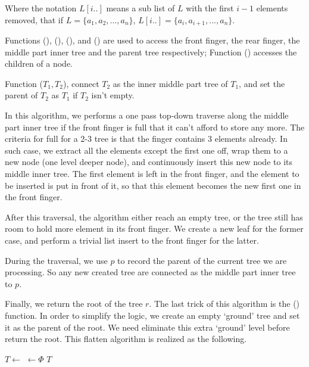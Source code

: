 \documentclass[UTF8]{article}
\begin{document}
Where the notation $L[i..]$ means a sub list of $L$ with the first $i-1$
elements removed, that if $L = \{a_1, a_2, ..., a_n\}$, $L[i..] = \{a_i, a_{i+1}, ..., a_n\}$.

Functions (), (), (), and ()
are used to access the front finger, the rear finger, the middle part inner tree and
the parent tree respectively; Function () accesses the children of a
node.

Function ($T_1, T_2$), connect $T_2$ as the inner middle part tree of
$T_1$, and set the parent of $T_2$ as $T_1$ if $T_2$ isn't empty.

In this algorithm, we performs a one pass top-down traverse along the middle part inner tree
if the front finger is full that it can't afford to store any more. The criteria for full
for a 2-3 tree is that the finger contains 3 elements already. In such case, we
extract all the elements except the first one off, wrap them to a new node (one level deeper node),
and continuously insert this new node to its middle inner tree. The first element is left
in the front finger, and the element to be inserted is put in front of it, so that this
element becomes the new first one in the front finger.

After this traversal, the algorithm either reach an empty tree, or the tree still has room
to hold more element in its front finger. We create a new leaf for the former case, and
perform a trivial list insert to the front finger for the latter.

During the traversal, we use $p$ to record the parent of the current tree we are processing.
So any new created tree are connected as the middle part inner tree to $p$.

Finally, we return the root of the tree $r$. The last trick of this algorithm is the ()
function. In order to simplify the logic, we create an empty `ground' tree and set
it as the parent of the root. We need eliminate this extra `ground' level before return the
root. This flatten algorithm is realized as the following.

\begin{algorithmic}
    \State $T \gets$ 
  \EndWhile
    \State {} $\gets \Phi$
  \EndIf
  \State \Return $T$
\EndFunction
\end{algorithmic}
\end{document}
